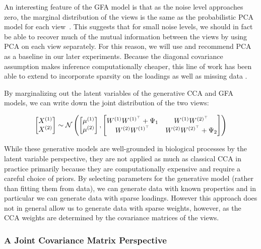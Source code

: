 An interesting feature of the GFA model is that as the noise level approaches zero, the marginal distribution of the views is the same as the probabilistic PCA model for each view~\cite{tipping1999probabilistic}.
This suggests that for small noise levels, we should in fact be able to recover much of the mutual information between the views by using PCA on each view separately.
For this reason, we will use and recommend PCA as a baseline in our later experiments.
Because the diagonal covariance assumption makes inference computationally cheaper, this line of work has been able to extend to incorporate sparsity on the loadings\cite{virtanen2011bayesian} as well as missing data \cite{ferreira2022hierarchical}.

By marginalizing out the latent variables of the generative CCA and GFA models, we can write down the joint distribution of the two views:

\begin{align}
    \begin{bmatrix} X^{(1)} \\ X^{(2)} \end{bmatrix} \sim \mathcal{N} \left( \begin{bmatrix} \mu^{(1)} \\ \mu^{(2)} \end{bmatrix}, \begin{bmatrix} W^{(1)}W^{(1)^{\top}} + \Psi_1 & W^{(1)}W^{(2)^{\top}} \\ W^{(2)}W^{(1)^{\top}} & W^{(2)}W^{(2)^{\top}} + \Psi_2 \end{bmatrix} \right)
\end{align}

While these generative models are well-grounded in biological processes by the latent variable perspective, they are not applied as much as classical CCA in practice primarily because they are computationally expensive and require a careful choice of priors.
By selecting parameters for the generative model (rather than fitting them from data), we can generate data with known properties and in particular we can generate data with sparse loadings.
However this approach does not in general allow us to generate data with sparse weights, however, as the CCA weights are determined by the covariance matrices of the views.

\subsubsection{A Joint Covariance Matrix Perspective}

